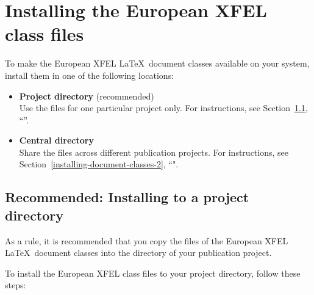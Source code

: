 \documentclass[]{xfel.eu-report}
\begin{document}
\section{Installing the European XFEL class files}
\label{installing-document-classes}

To make the European XFEL \LaTeX\ document classes available on your system,
install them in one of the following locations:

\begin{itemize}
\item {\bf Project directory} (recommended)\\ 
Use the files for one particular project only. For instructions, see Section~\ref{installing-document-classes-1}, ``''.
\linebreak
\item {\bf Central directory} \\ 
Share the files across different publication projects. For instructions, see Section~\ref{installing-document-classes-2}, ``".
\end{itemize}

\subsection{Recommended: Installing to a project directory}
\label{installing-document-classes-1}

As a rule, it is recommended that you copy the files of the European XFEL
\LaTeX\ document classes into the directory of your publication project. 

To install the European XFEL class files to your project directory, follow these steps:

\end{document}
